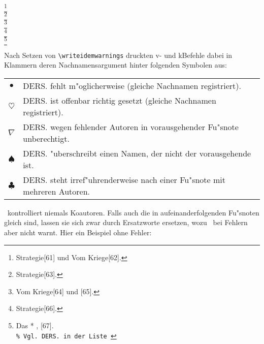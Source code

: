 \documentclass[12pt,a4paper]{article}
\begin{document}
{\writeidemwarnings
 \footnote{ {Strategie}[61] und 
       {Vom Kriege}[62].} 
 \\[8.25ex]
 \footnote{ {Strategie}[63].}
 \\[3ex]
 \footnote{ {Vom Kriege}[64] und 
      [65].}
 \\[8.25ex]
 \footnote{ {Strategie}[66].}
 \\[3ex]
 \footnote{ {Das 
                      
  *{} {, %
        }}[67].
        \\
        \texttt{\% Vgl.\ DERS. in der Liste }
        }
}

\vspace{1ex}\noindent
Nach Setzen von \verb|\writeidemwarnings| druckten v- und k\fhy Befehle 
dabei in Klammern deren Nachnamensargument hinter folgenden Symbolen aus:

 \vspace{2ex}\noindent
 {\small\begin{tabular}{cl}%
 $\bullet$    & \textsc{\footnotesize DERS.} \sffamily fehlt m"oglicherweise (gleiche Nachnamen registriert).              \\
 $\heartsuit$ & \textsc{\footnotesize DERS.} \sffamily ist offenbar richtig gesetzt (gleiche Nachnamen registriert).       \\
 $\nabla$     & \textsc{\footnotesize DERS.} \sffamily wegen fehlender Autoren in vorausgehender Fu"snote unberechtigt.    \\
 $\spadesuit$ & \textsc{\footnotesize DERS.} \sffamily "uberschreibt einen Namen, der nicht der vorausgehende ist.          \\
 $\clubsuit$  & \textsc{\footnotesize DERS.} \sffamily steht irref"uhrenderweise nach einer Fu"snote mit mehreren Autoren. \\
 \end{tabular}}

\vspace{2ex}\noindent
\BibArts\ kontrolliert niemals Koautoren. Falls auch die in
aufeinanderfolgenden Fu"snoten gleich sind, lassen sie sich zwar durch 
Ersatzworte ersetzen, wozu \BibArts\ bei Fehlern aber nicht warnt. 
Hier ein Beispiel ohne Fehler:
\end{document}
